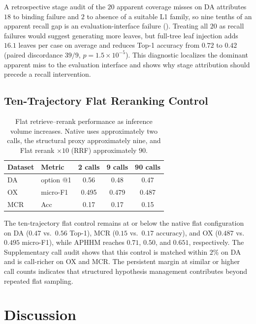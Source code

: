 \documentclass[letterpaper]{article} %
\begin{document}
A retrospective stage audit of the $20$ apparent coverage misses on DA attributes $18$ to binding failure and $2$ to absence of a suitable L1 family, so nine tenths of an apparent recall gap is an evaluation-interface failure ().
Treating all $20$ as recall failures would suggest generating more leaves, but full-tree leaf injection adds $16.1$ leaves per case on average and reduces Top-1 accuracy from $0.72$ to $0.42$ (paired discordance $39/9$, $p=1.5{\times}10^{-5}$).
This diagnostic localizes the dominant apparent miss to the evaluation interface and shows why stage attribution should precede a recall intervention.

\subsection{Ten-Trajectory Flat Reranking Control}
\label{sec:rq4}

\begin{table}[t]
\centering
\small
\begin{tabular}{@{}llccc@{}}
\toprule
Dataset & Metric & 2 calls & 9 calls & 90 calls \\
\midrule
DA & option @1 & 0.56 & 0.48 & 0.47 \\
OX & micro-F1 & 0.495 & 0.479 & 0.487 \\
MCR & Acc & 0.17 & 0.17 & 0.15 \\
\bottomrule
\end{tabular}
\caption{Flat retrieve--rerank performance as inference volume increases. Native uses approximately two calls, the structural proxy approximately nine, and Flat rerank $\times 10$ (RRF) approximately $90$.}
\label{tab:budget}

\end{table}

The ten-trajectory flat control remains at or below the native flat configuration on DA ($0.47$ vs.\ $0.56$ Top-1), MCR ($0.15$ vs.\ $0.17$ accuracy), and OX ($0.487$ vs.\ $0.495$ micro-F1), while APHHM reaches $0.71$, $0.50$, and $0.651$, respectively.
The Supplementary call audit shows that this control is matched within $2\%$ on DA and is call-richer on OX and MCR.
The persistent margin at similar or higher call counts indicates that structured hypothesis management contributes beyond repeated flat sampling.

\section{Discussion}
\label{sec:discussion}
\end{document}
